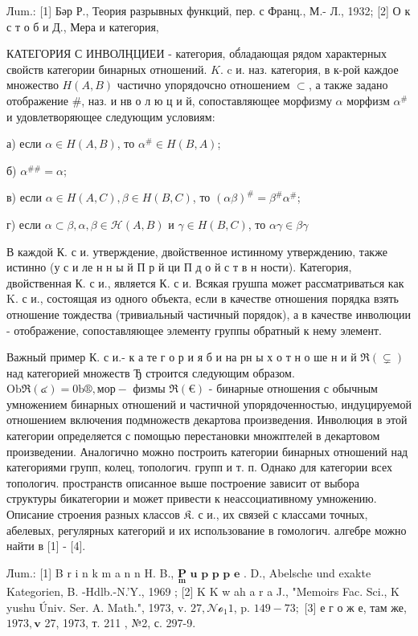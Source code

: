 \documentclass[10pt]{article}
\begin{document}
Лum.: [1] Бәр Р., Теория разрывных функций, пер. с Франц., М.- Л., 1932; [2] О к с т о б и Д., Мера и категория,



КАТЕГОРИЯ С ИНВОЛҢЦИЕИ - категория, об́ладающая рядом характерных свойств категории бинарных отношений. $K$. c и. наз. категория, в к-рой каждое множество $H(A, B)$ частично упорядочсно отношением $\subset$, а также задано отображение \#, наз. и нв о л ю ц и й, сопоставляющее морфизму $\alpha$ морфизм $\alpha^{\#}$ и удовлетворяющее следующим условиям:



а) если $\alpha \in H(A, B)$, то $\alpha^{\#} \in H(B, A)$;



б) $\alpha^{\# \#}=\alpha$;



в) если $\alpha \in H(A, C), \beta \in H(B, C)$, то $(\alpha \beta)^{\#}=\beta^{\#} \alpha^{\#}$;



г) если $\alpha \subset \beta, \alpha, \beta \in \mathcal{H}(A, B)$ и $\gamma \in H(B, C)$, то $\alpha \gamma \in \beta \gamma$



В каждой К. с и. утверждение, двойственное истинному утверждению, также истинно (у с и ле н н ы й П р й ци П д о й с т в н ности). Категория, двойственная К. с и., является К. с и. Всякая грушпа может рассматриваться как $\mathrm{K}$. с и., состоящая из одного объекта, если в качестве отношения порядка взять отношение тождества (тривиальный частичный порядок), а в качестве инволюции - отображение, сопоставляющее элементу группы обратный к нему элемент.



Важный пример К. с и.- к а те г о р и я б и на рн ы х о т н о ше н и й $\Re(\subsetneq)$ над категорией множеств Ђ строится следующим образом. $\mathrm{Ob \Re (๔)=0b®,} \mathrm{мор-}$ физмы $\mathfrak{R}(€)$ - бинарные отношения с обычным умножением бинарных отношений и частичной упорядоченностью, индуцируемой отношением включения подмножеств декартова произведения. Инволюция в этой категории определяется с помощью перестановки множптелей в декартовом произведении. Аналогично можно построить категории бинарных отношений над категориями групп, колец, топологич. групп и т. п. Однако для категории всех топологич. пространств описанное выше построение зависит от выбора структуры бикатегории и может привести к неассоциативному умножению. Описание строения разных классов $\mathfrak{K}$. с и., их связей с классами точных, абелевых, регулярных категорий и их использование в гомологич. алгебре можно найти в [1] - [4].



Лum.: [1] B r i n k m a n n H. B., $\underset{\mathbf{m}}{\mathbf{P}} \mathbf{\text { u p p p e }}$. D., Abelsche und exakte Kategorien, B. -Hdlb.-N.'Y., 1969 ; [2] K K w ah a r a J., "Memoirs Fac. Sci., K yushu Úniv. Ser. A. Math.", 1973, v. $27, \mathcal{N o}_{1} 1$, p. $149-73 ;$ [3] е г о ж е, там же, $1973, \mathbf{v}$ 27, 1973, т. 211 , №2, с. 297-9.
\end{document}
